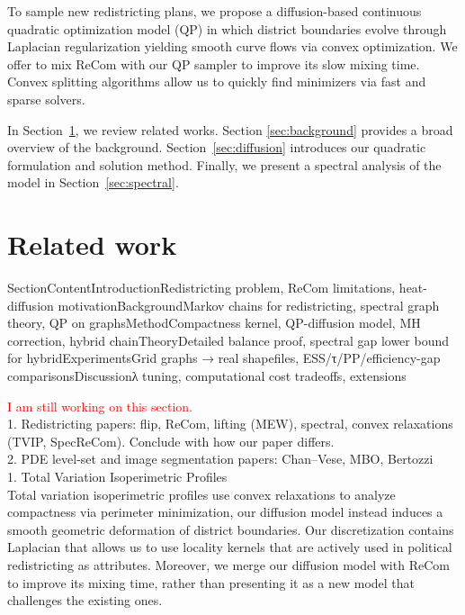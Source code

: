 \documentclass[11pt]{article}
\begin{document}
To sample new redistricting plans, we propose a diffusion-based continuous quadratic optimization model (QP) in which district boundaries evolve through Laplacian regularization yielding smooth curve flows via convex optimization. We offer to mix ReCom with our QP sampler to improve its slow mixing time. Convex splitting algorithms allow us to quickly find minimizers via fast and sparse solvers.

 In Section~\ref{sec:related}, we review related works. Section \ref{sec:background} provides a broad overview of the background. Section~\ref{sec:diffusion} introduces our quadratic formulation and solution method. Finally, we present a spectral analysis of the model in Section~\ref{sec:spectral}. 


\section{Related work}\label{sec:related}

SectionContentIntroductionRedistricting problem, ReCom limitations, heat-diffusion motivationBackgroundMarkov chains for redistricting, spectral graph theory, QP on graphsMethodCompactness kernel, QP-diffusion model, MH correction, hybrid chainTheoryDetailed balance proof, spectral gap lower bound for hybridExperimentsGrid graphs → real shapefiles, ESS/τ/PP/efficiency-gap comparisonsDiscussionλ tuning, computational cost tradeoffs, extensions

\textcolor{red}{ I am still working on this section.} \\

1. Redistricting papers: flip, ReCom, lifting (MEW), spectral, convex relaxations (TVIP, SpecReCom). Conclude with how our paper differs. \\

2. PDE level-set and image segmentation papers: Chan–Vese, MBO, Bertozzi \\

1. Total Variation Isoperimetric Profiles \cite{deford2019total} \\
Total variation isoperimetric profiles use convex relaxations to analyze compactness via perimeter minimization, our diffusion model instead induces a smooth geometric deformation of district boundaries.
Our discretization contains Laplacian that allows us to use locality kernels that are actively used in political redistricting as attributes. Moreover, we merge our diffusion model with ReCom to improve its mixing time, rather than presenting it as a new model that challenges the existing ones.  \\
\end{document}

